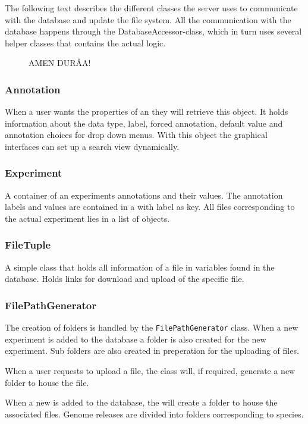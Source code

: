 The following text describes the different classes the server uses to communicate with the database and update the file system. All the communication with the database happens through the DatabaseAccessor-class, which in turn uses several helper classes that contains the actual logic. 

\begin{figure}[h]
\caption{AMEN DURÅA!}
\label{fig:dat_overview_schema}
\end{figure}

\subsubsection{Annotation}
When a user wants the properties of an  they will retrieve this object. It holds information about the data type, label, forced annotation, default value and annotation choices for drop down menus. With this object the graphical interfaces can set up a search view dynamically.

\subsubsection{Experiment}
A container of an experiments annotations and their values. The annotation labels and values are contained in a  with label as key. All files corresponding to the actual experiment lies in a list of  objects.

\subsubsection{FileTuple}
A simple class that holds all information of a file in variables found in the database. Holds links for download and upload of the specific file.

\subsubsection{FilePathGenerator}
The creation of folders is handled by the \texttt{FilePathGenerator} class. When a new experiment is added to the database a folder is also created for the new experiment. Sub folders are also created in preperation for the uploading of files.

When a user requests to upload a file, the  class will, if required, generate a new folder to house the file. 

When a new  is added to the database, the  will create a folder to house the associated files. Genome releases are divided into folders corresponding to species.

